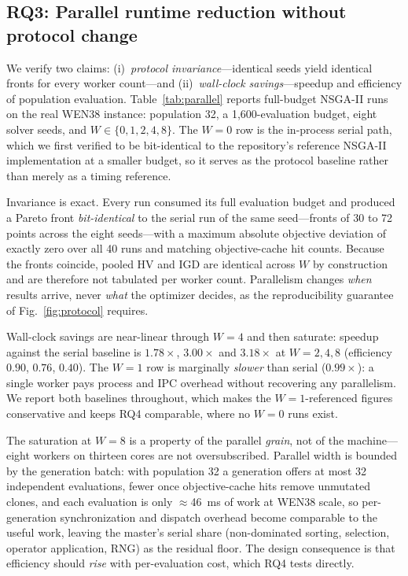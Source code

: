 \documentclass[10pt,conference,letterpaper]{IEEEtran}
\begin{document}
\subsection{RQ3: Parallel runtime reduction without protocol change}

We verify two claims: (i)~\emph{protocol invariance}---identical seeds
yield identical fronts for every worker count---and (ii)~\emph{wall-clock
savings}---speedup and efficiency of population evaluation.
Table~\ref{tab:parallel} reports full-budget NSGA-II runs on the real
WEN38 instance: population 32, a 1{,}600-evaluation budget, eight solver
seeds, and $W\in\{0,1,2,4,8\}$. The $W{=}0$ row is the in-process serial
path, which we first verified to be bit-identical to the repository's
reference NSGA-II implementation at a smaller budget, so it serves as the
protocol baseline rather than merely as a timing reference.

Invariance is exact. Every run consumed its full evaluation budget and
produced a Pareto front \emph{bit-identical} to the serial run of the same
seed---fronts of 30 to 72 points across the eight seeds---with a maximum
absolute objective deviation of exactly zero over all 40 runs and
matching objective-cache hit counts. Because the fronts coincide, pooled
HV and IGD are identical across $W$ by construction and are therefore not
tabulated per worker count. Parallelism changes \emph{when} results
arrive, never \emph{what} the optimizer decides, as the reproducibility
guarantee of Fig.~\ref{fig:protocol} requires.

Wall-clock savings are near-linear through $W{=}4$ and then saturate:
speedup against the serial baseline is $1.78\times$, $3.00\times$ and
$3.18\times$ at $W=2,4,8$ (efficiency $0.90$, $0.76$, $0.40$). The
$W{=}1$ row is marginally \emph{slower} than serial ($0.99\times$): a
single worker pays process and IPC overhead without recovering any
parallelism. We report both baselines throughout, which makes the
$W{=}1$-referenced figures conservative and keeps RQ4 comparable, where
no $W{=}0$ runs exist.

The saturation at $W{=}8$ is a property of the parallel \emph{grain}, not
of the machine---eight workers on thirteen cores are not
oversubscribed. Parallel width is bounded by the generation batch: with
population 32 a generation offers at most 32 independent evaluations,
fewer once objective-cache hits remove unmutated clones, and each
evaluation is only $\approx$46~ms of work at WEN38 scale, so
per-generation synchronization and dispatch overhead become comparable to
the useful work, leaving the master's serial share (non-dominated
sorting, selection, operator application, RNG) as the residual floor. The
design consequence is that efficiency should \emph{rise} with
per-evaluation cost, which RQ4 tests directly.
\end{document}
